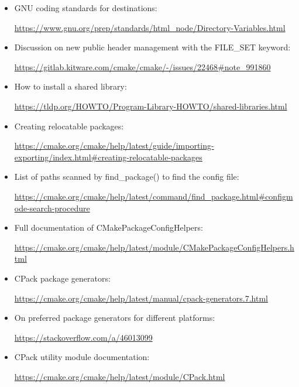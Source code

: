 

\begin{itemize}
\item
GNU coding standards for destinations:

\url{https://www.gnu.org/prep/standards/html_node/Directory-Variables.html}

\item
Discussion on new public header management with the FILE\_SET keyword:

\url{https://gitlab.kitware.com/cmake/cmake/-/issues/22468#note_991860}

\item
How to install a shared library:

\url{https://tldp.org/HOWTO/Program-Library-HOWTO/shared-libraries.html}

\item
Creating relocatable packages:

\url{https://cmake.org/cmake/help/latest/guide/importing-exporting/index.html#creating-relocatable-packages}

\item
List of paths scanned by find\_package() to find the config file:

\url{https://cmake.org/cmake/help/latest/command/find_package.html#configmode-search-procedure}

\item
Full documentation of CMakePackageConfigHelpers:

\url{https://cmake.org/cmake/help/latest/module/CMakePackageConfigHelpers.html}

\item
CPack package generators:

\url{https://cmake.org/cmake/help/latest/manual/cpack-generators.7.html}

\item
On preferred package generators for different platforms:

\url{https://stackoverflow.com/a/46013099}

\item
CPack utility module documentation:

\url{https://cmake.org/cmake/help/latest/module/CPack.html}
\end{itemize}